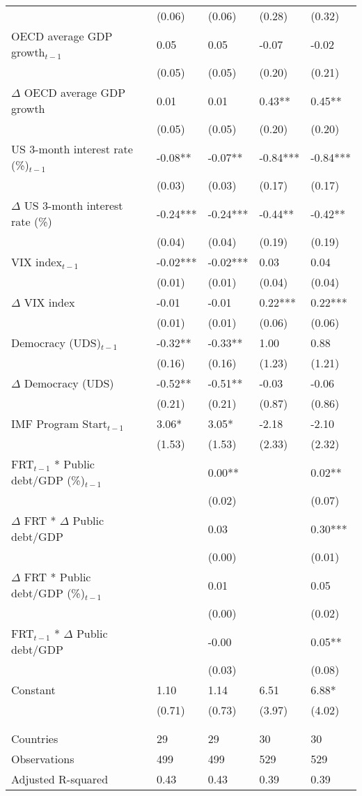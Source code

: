 \begin{tabular}{lp{3cm}p{3cm}p{3cm}p{3cm}}
   & (0.06) & (0.06) & (0.28) & (0.32) \\ 
  OECD average GDP growth$_{t-1}$ & 0.05 & 0.05 & -0.07 & -0.02 \\ 
   & (0.05) & (0.05) & (0.20) & (0.21) \\ 
  $\Delta$ OECD average GDP growth & 0.01 & 0.01 & 0.43** & 0.45** \\ 
   & (0.05) & (0.05) & (0.20) & (0.20) \\ 
  US 3-month interest rate (\%)$_{t-1}$ & -0.08** & -0.07** & -0.84*** & -0.84*** \\ 
   & (0.03) & (0.03) & (0.17) & (0.17) \\ 
  $\Delta$ US 3-month interest rate (\%) & -0.24*** & -0.24*** & -0.44** & -0.42** \\ 
   & (0.04) & (0.04) & (0.19) & (0.19) \\ 
  VIX index$_{t-1}$ & -0.02*** & -0.02*** & 0.03 & 0.04 \\ 
   & (0.01) & (0.01) & (0.04) & (0.04) \\ 
  $\Delta$ VIX index & -0.01 & -0.01 & 0.22*** & 0.22*** \\ 
   & (0.01) & (0.01) & (0.06) & (0.06) \\ 
  Democracy (UDS)$_{t-1}$ & -0.32** & -0.33** & 1.00 & 0.88 \\ 
   & (0.16) & (0.16) & (1.23) & (1.21) \\ 
  $\Delta$ Democracy (UDS) & -0.52** & -0.51** & -0.03 & -0.06 \\ 
   & (0.21) & (0.21) & (0.87) & (0.86) \\ 
  IMF Program Start$_{t-1}$ & 3.06* & 3.05* & -2.18 & -2.10 \\ 
   & (1.53) & (1.53) & (2.33) & (2.32) \\ 
  FRT$_{t-1}$ * Public debt/GDP (\%)$_{t-1}$ &  & 0.00** &  & 0.02** \\ 
   &  & (0.02) &  & (0.07) \\ 
  $\Delta$ FRT * $\Delta$ Public debt/GDP &  & 0.03 &  & 0.30*** \\ 
   &  & (0.00) &  & (0.01) \\ 
  $\Delta$ FRT * Public debt/GDP (\%)$_{t-1}$ &  & 0.01 &  & 0.05 \\ 
   &  & (0.00) &  & (0.02) \\ 
  FRT$_{t-1}$ * $\Delta$ Public debt/GDP &  & -0.00 &  & 0.05** \\ 
   &  & (0.03) &  & (0.08) \\ 
  Constant & 1.10 & 1.14 & 6.51 & 6.88* \\ 
   & (0.71) & (0.73) & (3.97) & (4.02) \\ 
   &  &  &  &  \\ 
   &  &  &  &  \\ 
  Countries & 29 & 29 & 30 & 30 \\ 
  Observations & 499 & 499 & 529 & 529 \\ 
  Adjusted R-squared & 0.43 & 0.43 & 0.39 & 0.39 \\ 
   \hline
\end{tabular}
\endgroup
